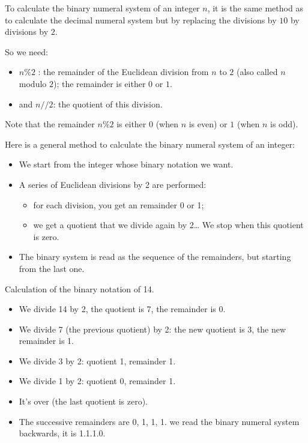 \documentclass[11pt,class=report,crop=false]{standalone}
\begin{document}
\begin{cours}

To calculate the binary numeral system of an integer $n$, it is the same method as to calculate the decimal numeral system but by replacing the divisions by $10$ by divisions by $2$.

So we need:
  \begin{itemize}
    \item $n\%2$ : the remainder of the Euclidean division from $n$ to $2$ (also called $n$ modulo $2$); the remainder is either $0$ or $1$.
    \item and $n//2$: the quotient of this division. 
  \end{itemize}
  
  Note that the remainder $n\%2$ is either $0$ (when $n$ is even) or $1$ (when $n$ is odd).
  
  Here is a general method to calculate the binary numeral system of an integer:
\begin{itemize}
  \item We start from the integer whose binary notation we want.
  
  \item A series of Euclidean divisions by 2 are performed: 
  \begin{itemize}
    \item for each division, you get an remainder 0 or 1; 
    \item we get a quotient that we divide again by 2\ldots{} We stop when this quotient is zero.
  \end{itemize}
  
  \item The binary system is read as the sequence of the remainders, but starting from the last one.
\end{itemize}

\begin{exemple}
Calculation of the binary notation of 14.

\begin{itemize}
  \item We divide 14 by 2, the quotient is 7, the remainder is 0.
  \item We divide 7 (the previous quotient) by 2: the new quotient is 3, the new remainder is 1.
  \item We divide 3 by 2: quotient 1, remainder 1.
  \item We divide 1 by 2: quotient 0, remainder 1.
  \item It's over (the last quotient is zero).
  \item The successive remainders are 0, 1, 1, 1. we read the binary numeral system backwards, it is 1.1.1.0.  
\end{itemize}


\end{exemple}
\end{cours}
\end{document}
